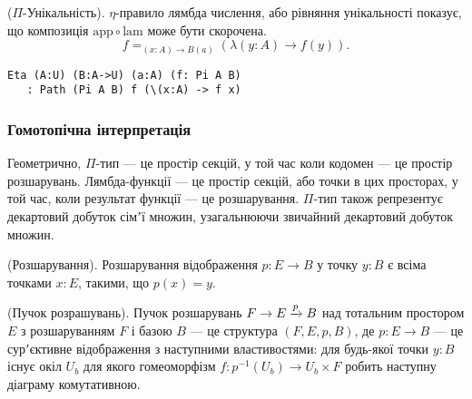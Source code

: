 \begin{theorem} ($\Pi$-Унікальність). $\eta$-правило лямбда числення, або рівняння
унікальності показує, що композиція $\mathrm{app} \circ \mathrm{lam}$ може бути скорочена.
$$f =_{(x:A)\rightarrow B(a)} (\lambda (y:A) \rightarrow f(y)).$$
\begin{lstlisting}
Eta (A:U) (B:A->U) (a:A) (f: Pi A B)
   : Path (Pi A B) f (\(x:A) -> f x)
\end{lstlisting}
\end{theorem}


\subsubsection*{Гомотопічна інтерпретація}
Геометрично, $\Pi$-тип — це простір секцій, у той час коли кодомен — це простір розшарувань.
Лямбда-функції — це простір секцій, або точки в цих просторах, у той час, коли результат функції — це розшарування.
$\Pi$-тип також репрезентує декартовий добуток сімʼї множин, узагальнюючи звичайний декартовий добуток множин.

\begin{definition} (Розшарування).
Розшарування відображення $p: E \rightarrow B$ у точку $y: B$ є всіма точками $x: E$, такими, що $p(x)=y$.
\end{definition}

\begin{definition} (Пучок розрашувань).
Пучок розшарувань $ F \rightarrow E \xrightarrow{{p}} B$ над тотальним простором $E$ з розшаруванням $F$ і базою $B$ — це
структура $(F,E,p,B)$, де $p: E \rightarrow B$ — це сурʼєктивне відображення з наступними властивостями:
для будь-якої точки $y: B$ існує окіл $U_b$ для якого гомеоморфізм $f: p^{-1}(U_b) \rightarrow U_b \times F$
робить наступну діаграму комутативною.
\begin{center}
\end{center}
\end{definition}

